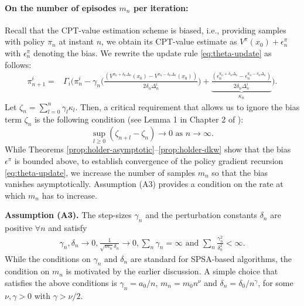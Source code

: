 \documentclass[11pt,letterpaper,english]{article}
\begin{document}
\paragraph{On the number of episodes $m_n$ per iteration:}
Recall that the CPT-value estimation scheme is biased, i.e., providing samples with policy $\pi_n$ at instant $n$, we obtain its CPT-value estimate as $V^{\pi}(x_0) + \epsilon_n^\pi$ with $\epsilon_n^\pi$ denoting the bias. 
We rewrite the update rule \eqref{eq:theta-update} as follows:
\begin{align*}
\pi^{i}_{n+1}  = & \Gamma_{i}\bigg( \pi^{i}_n -  \gamma_n \bigg( \frac{(V^{\pi_n +\delta_n\Delta_n}(x_0) - V^{\pi_n-\delta_n\Delta_n}(x_0))}{2\delta_n\Delta_n^{i}}\bigg) + \underbrace{\frac{(\epsilon_n^{\pi_n +\delta_n\Delta_n} - \epsilon_n^{\pi_n-\delta_n\Delta_n})}{2\delta_n\Delta_n^{i}}}_{\kappa_n}\bigg).
\end{align*}
Let $\zeta_n = \sum_{l = 0}^{n} \gamma_l \kappa_{l}$. Then, a critical requirement that allows us to ignore the bias term $\zeta_n$ is the following condition (see Lemma 1 in Chapter 2 of \cite{borkar2008stochastic}): 
$$\sup_{l\ge0} \left (\zeta_{n+l} - \zeta_n \right) \rightarrow 0 \text{ as } n\rightarrow\infty.$$ 
While Theorems \ref{prop:holder-asymptotic}--\ref{prop:holder-dkw} show that the bias $\epsilon^\pi$ is bounded above, to establish convergence of the policy gradient recursion \eqref{eq:theta-update}, we increase the number of samples $m_n$ so that the bias vanishes asymptotically.  Assumption (A3) provides a condition on the rate at which $m_n$ has to increase.

\noindent\textbf{Assumption (A3).}  The step-sizes $\gamma_n$ and the perturbation constants 
$\delta_n$ are positive $\forall n$ and satisfy
\begin{align*}
\gamma_n, \delta_n \rightarrow 0, \frac{1}{\sqrt{m_n}\delta_n}\rightarrow 0,  \sum_n \gamma_n=\infty \text{ and } \sum_n \frac{\gamma_n^2}{\delta_n^2}<\infty. 
\end{align*}
While the conditions on $\gamma_n$ and $\delta_n$ are standard for SPSA-based algorithms, the condition on $m_n$ is motivated by the earlier discussion. 
A simple choice that satisfies the above conditions is $\gamma_n = a_0/n$, $m_n = m_0 n^\nu$ and $\delta_n = \delta_0/{n^\gamma}$, for some $\nu, \gamma >0$ with $\gamma > \nu/2$.
\end{document}
